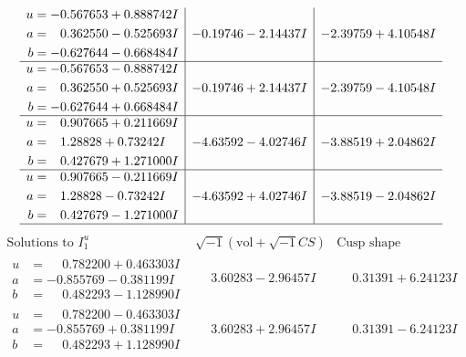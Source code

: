 \documentclass[1p]{elsarticle_modified}
\theoremstyle{definition}
\newcommand{\I}{\sqrt{-1}}
\begin{document}
$$\begin{array}{c|c|c}
\begin{aligned}
u &= -0.567653 + 0.888742 I \\
a &= \phantom{-}0.362550 - 0.525693 I \\
b &= -0.627644 - 0.668484 I\end{aligned}
 & -0.19746 - 2.14437 I & -2.39759 + 4.10548 I \\ \hline\begin{aligned}
u &= -0.567653 - 0.888742 I \\
a &= \phantom{-}0.362550 + 0.525693 I \\
b &= -0.627644 + 0.668484 I\end{aligned}
 & -0.19746 + 2.14437 I & -2.39759 - 4.10548 I \\ \hline\begin{aligned}
u &= \phantom{-}0.907665 + 0.211669 I \\
a &= \phantom{-}1.28828 + 0.73242 I \\
b &= \phantom{-}0.427679 + 1.271000 I\end{aligned}
 & -4.63592 - 4.02746 I & -3.88519 + 2.04862 I \\ \hline\begin{aligned}
u &= \phantom{-}0.907665 - 0.211669 I \\
a &= \phantom{-}1.28828 - 0.73242 I \\
b &= \phantom{-}0.427679 - 1.271000 I\end{aligned}
 & -4.63592 + 4.02746 I & -3.88519 - 2.04862 I\\
 \hline 
 \end{array}$$\newpage$$\begin{array}{c|c|c}  
\text{Solutions to }I^u_{1}& \I (\text{vol} + \sqrt{-1}CS) & \text{Cusp shape}\\
 \hline 
\begin{aligned}
u &= \phantom{-}0.782200 + 0.463303 I \\
a &= -0.855769 - 0.381199 I \\
b &= \phantom{-}0.482293 - 1.128990 I\end{aligned}
 & \phantom{-}3.60283 - 2.96457 I & \phantom{-}0.31391 + 6.24123 I \\ \hline\begin{aligned}
u &= \phantom{-}0.782200 - 0.463303 I \\
a &= -0.855769 + 0.381199 I \\
b &= \phantom{-}0.482293 + 1.128990 I\end{aligned}
 & \phantom{-}3.60283 + 2.96457 I & \phantom{-}0.31391 - 6.24123 I \\ \hline\begin{aligned}

\end{aligned}
\end{array}$$
\end{document}
